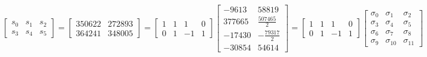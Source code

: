 \documentclass{article}%
\begin{document}
\[%
\left[\begin{matrix}s_{0} & s_{1} & s_{2}\\s_{3} & s_{4} & s_{5}\end{matrix}\right] = \left[\begin{matrix}350622 & 272893\\364241 & 348005\end{matrix}\right] = \left[\begin{matrix}1 & 1 & 1 & 0\\0 & 1 & -1 & 1\end{matrix}\right] \left[\begin{matrix}-9613 & 58819\\377665 & \frac{507465}{2}\\-17430 & - \frac{79317}{2}\\-30854 & 54614\end{matrix}\right] = \left[\begin{matrix}1 & 1 & 1 & 0\\0 & 1 & -1 & 1\end{matrix}\right] \left[\begin{matrix}\sigma_{0} & \sigma_{1} & \sigma_{2}\\\sigma_{3} & \sigma_{4} & \sigma_{5}\\\sigma_{6} & \sigma_{7} & \sigma_{8}\\\sigma_{9} & \sigma_{10} & \sigma_{11}\end{matrix}\right]%
\]%
\end{document}
